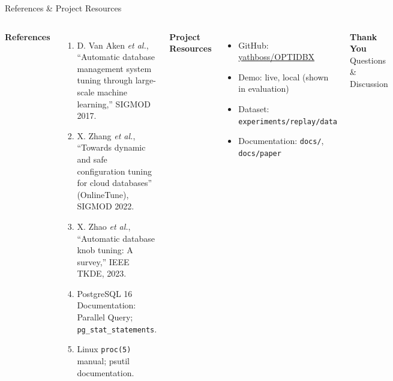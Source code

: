 \documentclass[aspectratio=169,11pt]{beamer}
\begin{document}
\begin{frame}{References \& Project Resources}

\begin{columns}[T,totalwidth=\textwidth]


\textbf{\color{GEUBlue}References}

\begin{enumerate}\itemsep1pt\scriptsize
    \item D. Van Aken \textit{et al.}, ``Automatic database management system
          tuning through large-scale machine learning,'' SIGMOD 2017.
    \item X. Zhang \textit{et al.}, ``Towards dynamic and safe configuration
          tuning for cloud databases'' (OnlineTune), SIGMOD 2022.
    \item X. Zhao \textit{et al.}, ``Automatic database knob tuning: A survey,''
          IEEE TKDE, 2023.
    \item PostgreSQL 16 Documentation: Parallel Query; \texttt{pg\_stat\_statements}.
    \item Linux \texttt{proc(5)} manual; psutil documentation.
\end{enumerate}


\textbf{\color{GEUBlue}Project Resources}

\begin{itemize}\itemsep2pt\small
    \item GitHub: \href{https://github.com/yathboss/OPTIDBX}{yathboss/OPTIDBX}
    \item Demo: live, local (shown in evaluation)
    \item Dataset: \texttt{experiments/replay/data}
    \item Documentation: \texttt{docs/}, \texttt{docs/paper}
\end{itemize}

\vfill

\begin{center}

\colorbox{GEUBlue}{
\parbox{.82\textwidth}{
\centering
\color{white}
\Large\textbf{Thank You}\\[1mm]
\normalsize Questions \& Discussion
}}

\end{center}

\end{columns}

\end{frame}
\end{document}
